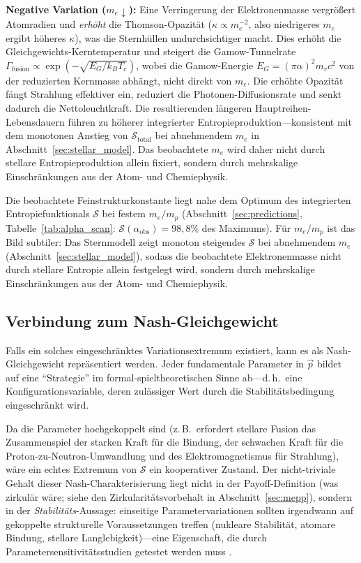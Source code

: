 \documentclass[12pt,a4paper]{article}
\theoremstyle{remark}
\begin{document}
\textbf{Negative Variation ($m_e \downarrow$):} Eine Verringerung der Elektronenmasse vergr\"o\ss{}ert Atomradien und \emph{erh\"oht} die Thomson-Opazit\"at ($\kappa \propto m_e^{-2}$, also niedrigeres $m_e$ ergibt h\"oheres $\kappa$), was die Sternh\"ullen undurchsichtiger macht. Dies erh\"oht die Gleichgewichts-Kerntemperatur und steigert die Gamow-Tunnelrate $\Gamma_{\text{fusion}} \propto \exp(-\sqrt{E_G / k_B T_c})$, wobei die Gamow-Energie $E_G = (\pi \alpha)^2 m_r c^2$ von der reduzierten Kernmasse abh\"angt, nicht direkt von $m_e$. Die erh\"ohte Opazit\"at f\"angt Strahlung effektiver ein, reduziert die Photonen-Diffusionsrate und senkt dadurch die Nettoleuchtkraft. Die resultierenden l\"angeren Hauptreihen-Lebensdauern f\"uhren zu h\"oherer integrierter Entropieproduktion---konsistent mit dem monotonen Anstieg von $\mathcal{S}_{\text{total}}$ bei abnehmendem $m_e$ in Abschnitt~\ref{sec:stellar_model}. Das beobachtete $m_e$ wird daher nicht durch stellare Entropieproduktion allein fixiert, sondern durch mehrskalige Einschr\"ankungen aus der Atom- und Chemiephysik.

Die beobachtete Feinstrukturkonstante liegt nahe dem Optimum des integrierten Entropiefunktionals $\mathcal{S}$ bei festem $m_e/m_p$ (Abschnitt~\ref{sec:predictions}, Tabelle~\ref{tab:alpha_scan}: $\mathcal{S}(\alpha_{\text{obs}}) = 98{,}8\%$ des Maximums). F\"ur $m_e/m_p$ ist das Bild subtiler: Das Sternmodell zeigt monoton steigendes $\mathcal{S}$ bei abnehmendem $m_e$ (Abschnitt~\ref{sec:stellar_model}), sodass die beobachtete Elektronenmasse nicht durch stellare Entropie allein festgelegt wird, sondern durch mehrskalige Einschr\"ankungen aus der Atom- und Chemiephysik.

\subsection{Verbindung zum Nash-Gleichgewicht}

Falls ein solches eingeschr\"anktes Variationsextremum existiert, kann es als Nash-Gleichgewicht repr\"asentiert werden. Jeder fundamentale Parameter in $\vec{p}$ bildet auf eine ``Strategie'' im formal-spieltheoretischen Sinne ab---d.\,h.\ eine Konfigurationsvariable, deren zul\"assiger Wert durch die Stabilit\"atsbedingung eingeschr\"ankt wird.

Da die Parameter hochgekoppelt sind (z.\,B.\ erfordert stellare Fusion das Zusammenspiel der starken Kraft f\"ur die Bindung, der schwachen Kraft f\"ur die Proton-zu-Neutron-Umwandlung und des Elektromagnetismus f\"ur Strahlung), w\"are ein echtes Extremum von $\mathcal{S}$ ein kooperativer Zustand. Der nicht-triviale Gehalt dieser Nash-Charakterisierung liegt nicht in der Payoff-Definition (was zirkul\"ar w\"are; siehe den Zirkularit\"atsvorbehalt in Abschnitt~\ref{sec:mepp}), sondern in der \emph{Stabilit\"ats}-Aussage: einseitige Parametervariationen sollten irgendwann auf gekoppelte strukturelle Voraussetzungen treffen (nukleare Stabilit\"at, atomare Bindung, stellare Langlebigkeit)---eine Eigenschaft, die durch Parametersensitivit\"atsstudien getestet werden muss \citep{Adams2019}.
\end{document}

